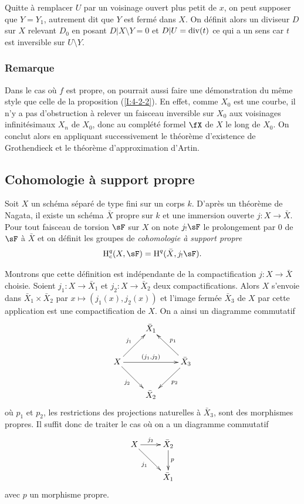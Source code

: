 Quitte à remplacer $U$ par un voisinage ouvert plus petit de $x$, on peut 
supposer que $Y=Y_1$, autrement dit que $Y$ est fermé dans $X$. On définit 
alors un diviseur $D$ sur $X$ relevant $D_0$ en posant $D|X\setminus Y=0$ et 
$D|U=\operatorname{div}(t)$ ce qui a un sens car $t$ est inversible sur $U\setminus Y$. 





\subsubsection{Remarque}\label{I:4-4-2}

Dans le cas où $f$ est propre, on pourrait aussi faire une démonstration 
du même style que celle de la proposition (\ref{I:4-2-2}). En effet, comme 
$X_0$ est une courbe, il n'y a pas d'obstruction à relever un faisceau 
inversible sur $X_0$ aux voisinages infinitésimaux $X_n$ de $X_0$, donc au 
complété formel $\fX$ de $X$ le long de $X_0$. On conclut alors en 
appliquant successivement le théorème d'existence de Grothendieck et le 
théorème d'approximation d'Artin. 










\subsection{Cohomologie à support propre}\label{I:4-5}





\begin{definition}\label{I:4-5-1}
Soit $X$ un schéma séparé de type fini sur un corps $k$. D'après un 
théorème de Nagata, il existe un schéma $\bar X$ propre sur $k$ et une 
immersion ouverte $j:X\to\bar X$. Pour tout faisceau de torsion $\sF$ sur $X$ on 
note $j_! \sF$ le prolongement par $0$ de $\sF$ à $\bar X$ et on définit les 
groupes de \emph{cohomologie à support propre} 
\[
  \h_c^q(X,\sF)=\h^q(\bar X, j_! \sF) \text{.}
\]
\end{definition}

Montrons que cette définition est indépendante de la compactification 
$j:X\to\bar X$ choisie. Soient $j_1:X\to \bar X_1$ et $j_2:X\to \bar X_2$ deux 
compactifications. Alors $X$ s'envoie dans $\bar X_1\times \bar X_2$ par 
$x\mapsto (j_1(x),j_2(x))$ et l'image fermée $\bar X_3$ de $X$ par cette 
application est une compactification de $X$. On a ainsi un diagramme commutatif 
\[\xymatrix{
  & \bar X_1 \\
  X \ar[ur]^-{j_1} \ar[rr]^-{(j_1,j_2)} \ar[dr]_-{j_2} 
    & & \bar X_3 \ar[ul]_-{p_1} \ar[dl]^-{p_2} \\
  & \bar X_2
}\]
où $p_1$ et $p_2$, les restrictions des projections naturelles à 
$\bar X_3$, sont des morphismes propres. Il suffit donc de traiter le cas où 
on a un diagramme commutatif 
\[\xymatrix{
  X \ar[r]^-{j_2} \ar[dr]_-{j_1} 
    & \bar X_2 \ar[d]^-p \\
  & \bar X_1
}\]
avec $p$ un morphisme propre. 





